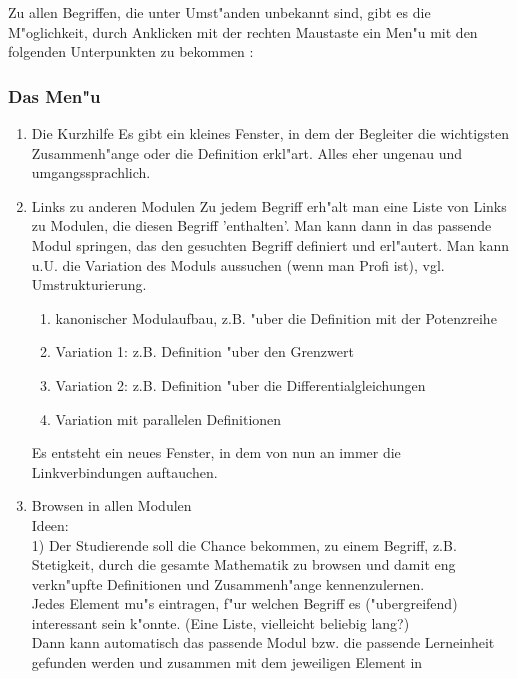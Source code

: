     Zu allen Begriffen, die unter Umst"anden unbekannt sind, gibt
    es die M"oglichkeit, durch Anklicken mit der rechten Maustaste
    ein Men"u mit den folgenden Unterpunkten zu bekommen :

\subsubsection{Das Men"u}

\begin{enumerate}
    \item Die Kurzhilfe
    Es gibt ein kleines Fenster, in dem der Begleiter die
    wichtigsten Zusammenh"ange oder die Definition erkl"art.
    Alles eher ungenau und umgangssprachlich.
    \item Links zu anderen Modulen
    Zu jedem Begriff erh"alt man eine Liste von Links zu Modulen,
    die diesen Begriff 'enthalten'. Man kann dann in das passende
    Modul springen, das den gesuchten Begriff definiert und
    erl"autert.
    Man kann u.U. die Variation des Moduls aussuchen
    (wenn man Profi ist), vgl. Umstrukturierung.
     \begin{enumerate}
            \item kanonischer Modulaufbau, z.B. "uber die
            Definition mit der Potenzreihe
            \item Variation 1: z.B. Definition "uber den
            Grenzwert
            \item Variation 2: z.B. Definition "uber die
            Differentialgleichungen
            \item Variation mit parallelen Definitionen
        \end{enumerate}
    Es entsteht ein neues Fenster, in dem von nun an immer die
    Linkverbindungen auftauchen.\\
    \item Browsen in allen Modulen\\
    Ideen:\\
    1)
    Der Studierende soll die Chance bekommen, zu einem Begriff, z.B.
    Stetigkeit, durch die gesamte Mathematik zu browsen und damit
    eng verkn"upfte Definitionen und Zusammenh"ange
    kennenzulernen.\\
       Jedes Element mu"s eintragen, f"ur welchen Begriff es
    ("ubergreifend) interessant sein k"onnte. (Eine Liste,
    vielleicht beliebig lang?)\\Dann kann
    automatisch das passende Modul bzw. die passende Lerneinheit
    gefunden werden und zusammen mit dem jeweiligen Element in

\end{enumerate}
